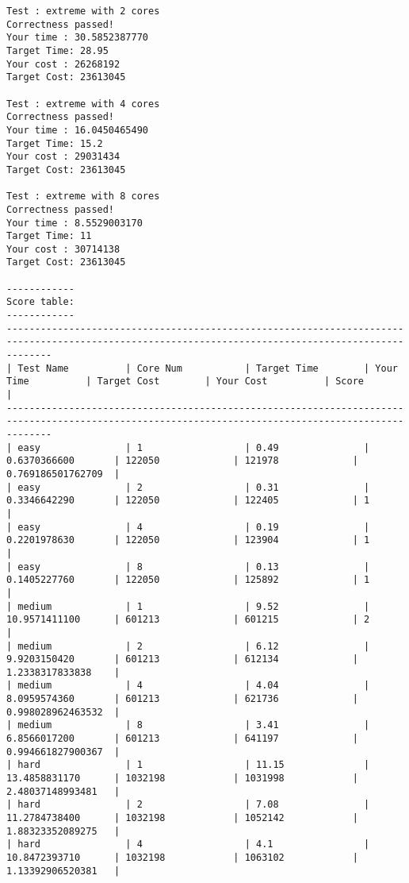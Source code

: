 \documentclass[letterpaper,11pt]{exam}
\begin{document}
\begin{questions}
\begin{lstlisting}[basicstyle=\tiny\ttfamily]
Test : extreme with 2 cores
Correctness passed!
Your time : 30.5852387770
Target Time: 28.95
Your cost : 26268192
Target Cost: 23613045

Test : extreme with 4 cores
Correctness passed!
Your time : 16.0450465490
Target Time: 15.2
Your cost : 29031434
Target Cost: 23613045

Test : extreme with 8 cores
Correctness passed!
Your time : 8.5529003170
Target Time: 11
Your cost : 30714138
Target Cost: 23613045

------------
Score table:
------------
----------------------------------------------------------------------------------------------------------------------------------------------------
| Test Name          | Core Num           | Target Time        | Your Time          | Target Cost        | Your Cost          | Score              |
----------------------------------------------------------------------------------------------------------------------------------------------------
| easy               | 1                  | 0.49               | 0.6370366600       | 122050             | 121978             | 0.769186501762709  |
| easy               | 2                  | 0.31               | 0.3346642290       | 122050             | 122405             | 1                  |
| easy               | 4                  | 0.19               | 0.2201978630       | 122050             | 123904             | 1                  |
| easy               | 8                  | 0.13               | 0.1405227760       | 122050             | 125892             | 1                  |
| medium             | 1                  | 9.52               | 10.9571411100      | 601213             | 601215             | 2                  |
| medium             | 2                  | 6.12               | 9.9203150420       | 601213             | 612134             | 1.2338317833838    |
| medium             | 4                  | 4.04               | 8.0959574360       | 601213             | 621736             | 0.998028962463532  |
| medium             | 8                  | 3.41               | 6.8566017200       | 601213             | 641197             | 0.994661827900367  |
| hard               | 1                  | 11.15              | 13.4858831170      | 1032198            | 1031998            | 2.48037148993481   |
| hard               | 2                  | 7.08               | 11.2784738400      | 1032198            | 1052142            | 1.88323352089275   |
| hard               | 4                  | 4.1                | 10.8472393710      | 1032198            | 1063102            | 1.13392906520381   |

\end{lstlisting}
\end{questions}
\end{document}
